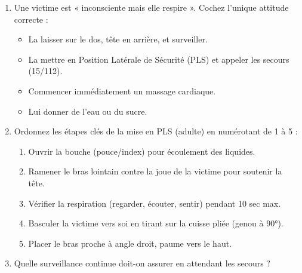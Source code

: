 \documentclass[11pt]{article}
\begin{document}
\begin{exercice}
\begin{enumerate}
    \item Une victime est « inconsciente mais elle respire ». Cochez l'unique attitude correcte :
\begin{itemize}
        \item[] La laisser sur le dos, tête en arrière, et surveiller.
        \item[] La mettre en Position Latérale de Sécurité (PLS) et appeler les secours (15/112).
        \item[] Commencer immédiatement un massage cardiaque.
        \item[] Lui donner de l'eau ou du sucre.
    \end{itemize}
    \item Ordonnez les étapes clés de la mise en PLS (adulte) en numérotant de 1 à 5 :
    \begin{enumerate}
        \item[] \underline{\hspace{0.5cm}} Ouvrir la bouche (pouce/index) pour écoulement des liquides.
        \item[] \underline{\hspace{0.5cm}} Ramener le bras lointain contre la joue de la victime pour soutenir la tête.
        \item[] \underline{\hspace{0.5cm}} Vérifier la respiration (regarder, écouter, sentir) pendant 10 sec max.
        \item[] \underline{\hspace{0.5cm}} Basculer la victime vers soi en tirant sur la cuisse pliée (genou à 90°).
        \item[] \underline{\hspace{0.5cm}} Placer le bras proche à angle droit, paume vers le haut.
    \end{enumerate}
    \item Quelle surveillance continue doit-on assurer en attendant les secours ?
    \underline{\hspace{10cm}}
\end{enumerate}
\end{exercice}
\end{document}
